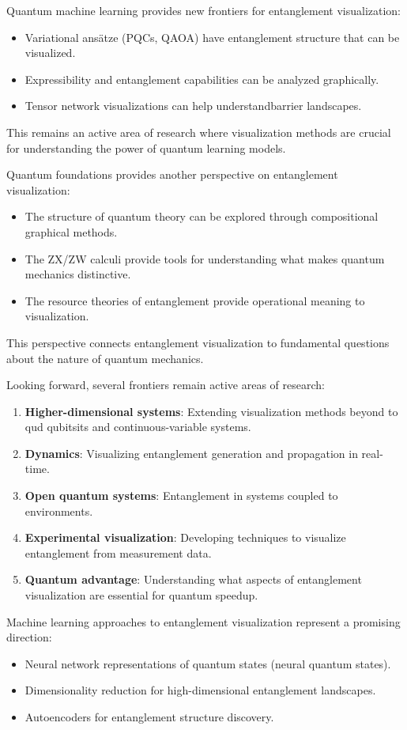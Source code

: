 \documentclass[12pt,a4paper]{article}
\begin{document}
Quantum machine learning provides new frontiers for entanglement visualization:
\begin{itemize}
	\item Variational ansätze (PQCs, QAOA) have entanglement structure that can be visualized.
	\item Expressibility and entanglement capabilities can be analyzed graphically.
	\item Tensor network visualizations can help understandbarrier landscapes.
\end{itemize}

This remains an active area of research where visualization methods are crucial for understanding the power of quantum learning models.

Quantum foundations provides another perspective on entanglement visualization:
\begin{itemize}
	\item The structure of quantum theory can be explored through compositional graphical methods.
	\item The ZX/ZW calculi provide tools for understanding what makes quantum mechanics distinctive.
	\item The resource theories of entanglement provide operational meaning to visualization.
\end{itemize}

This perspective connects entanglement visualization to fundamental questions about the nature of quantum mechanics.

Looking forward, several frontiers remain active areas of research:

\begin{enumerate}
	\item \textbf{Higher-dimensional systems}: Extending visualization methods beyond to qud qubitsits and continuous-variable systems.
	\item \textbf{Dynamics}: Visualizing entanglement generation and propagation in real-time.
	\item \textbf{Open quantum systems}: Entanglement in systems coupled to environments.
	\item \textbf{Experimental visualization}: Developing techniques to visualize entanglement from measurement data.
	\item \textbf{Quantum advantage}: Understanding what aspects of entanglement visualization are essential for quantum speedup.
\end{enumerate}

Machine learning approaches to entanglement visualization represent a promising direction:
\begin{itemize}
	\item Neural network representations of quantum states (neural quantum states).
	\item Dimensionality reduction for high-dimensional entanglement landscapes.
	\item Autoencoders for entanglement structure discovery.
\end{itemize}
\end{document}
